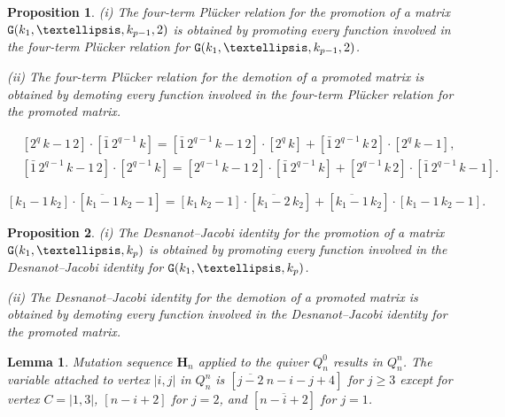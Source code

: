 \documentclass[10pt,a4paper]{amsart}
\newtheorem{proposition}{Proposition}
\newtheorem{lemma}{Lemma}
\def\Hs{\mathbf H}
\def\NG{{\tt G}}
\begin{document}
\begin{proposition}\label{promo1}
{\rm (i)} The four-term Pl\"ucker relation for the promotion of a matrix $\NG(k_1,\dots,k_{p-1},2)$ is obtained by promoting every function involved in the four-term Pl\"ucker relation for $\NG(k_1,\dots,k_{p-1},2)$.

{\rm(ii)} The four-term Pl\"ucker relation for the demotion of a promoted matrix is obtained by demoting every function involved in the four-term Pl\"ucker relation for the promoted matrix.
\end{proposition}

\begin{equation}\label{promo4pluck}
\begin{aligned}
&[2^q\,k-1\,2]\cdot[\bar1\, 2^{q-1}\,k]=[\bar1\,2^{q-1}\,k-1\,2]\cdot[2^q\,k]+[\bar1\,2^{q-1}\,k\,2]\cdot[2^q\,k-1],\\
&[\bar1\,2^{q-1}\,k-1\,2]\cdot[2^{q-1}\,k]=[2^{q-1}\,k-1\,2]\cdot[\bar1\,2^{q-1}\,k]+[2^{q-1}\,k\,2]\cdot[\bar1\,2^{q-1}\,k-1].
\end{aligned}
\end{equation}

\begin{equation}\label{DJ}
[k_1-1\,k_2]\cdot[\overline{k_1-1}\,k_2-1]=[k_1\,k_2-1]\cdot[\overline{k_1-2}\,k_2]+[\overline{k_1-1}\,k_2]
\cdot[k_1-1\,k_2-1].
\end{equation}

\begin{proposition}\label{promo2}
{\rm (i)} The Desnanot--Jacobi identity for the promotion of a matrix $\NG(k_1,\dots,k_{p})$ is obtained by promoting every function involved in the Desnanot--Jacobi identity for $\NG(k_1,\dots,k_p)$.

{\rm (ii)} The Desnanot--Jacobi identity for the demotion of a promoted matrix is obtained by demoting every function involved in the Desnanot--Jacobi identity for the promoted matrix.
\end{proposition}

\begin{lemma} Mutation sequence $\Hs_n$ applied to the quiver $Q_n^0$ results in $Q_n^n$. The variable attached to vertex $|i,j|$ in $Q_n^n$ is $[\overline{j-2}\ n-i-j+4]$ for $j\ge 3$ except for vertex $C=|1,3|$, $[n-i+2]$ for 
$j=2$, and $[\overline{n-i+2}]$ for $j=1$. %
\end{lemma}
\end{document}
